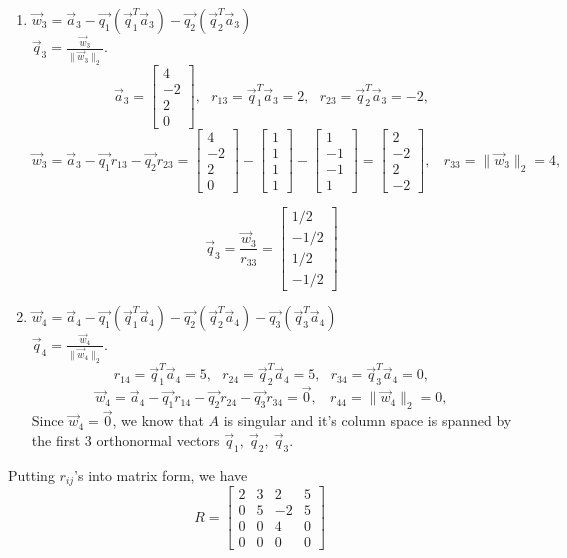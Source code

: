 \documentclass{article}
\newcommand{\norm}[1]{\|#1\|}
\newcommand{\normII}[1]{\norm{#1}_2}
\newcommand{\bmat}[1]{\begin{bmatrix}#1\end{bmatrix}}
\newcommand{\sij}{_{ij}}
\begin{document}
\begin{enumerate}
\item $\vec w_3 = \vec a_3 - \vec{q_1} (\vec q_1^T \vec a_3) - \vec{q_2} (\vec q_2^T \vec a_3)$\\
$\vec q_3 = \frac{\vec w_3}{\normII{\vec w_3}}.$
\[ \vec a_3 = \bmat{4 \\ -2 \\ 2 \\ 0},\ \ \ r_{13} = \vec q_1^T \vec a_3 = 2,\ \ \ r_{23} = \vec q_2^T \vec a_3 = -2, \] 
\[ \vec w_3 = \vec a_3 - \vec{q_1}r_{13} - \vec{q_2}r_{23} =  \bmat{4 \\ -2 \\ 2 \\ 0} - \bmat{1 \\ 1 \\ 1 \\ 1} - \bmat{1 \\ -1 \\ -1 \\ 1} = \bmat{2 \\ -2 \\ 2 \\ -2},\ \ \ \ r_{33} = \normII{\vec w_3} = 4, \]

\[ \vec q_3 = \frac{\vec w_3}{r_{33}} = \bmat{1/2 \\ -1/2 \\ 1/2 \\ -1/2} \]

\item $\vec w_4 = \vec a_4 - \vec{q_1} (\vec q_1^T \vec a_4) - \vec{q_2} (\vec q_2^T \vec a_4) - \vec{q_3} (\vec q_3^T \vec a_4)$\\
$\vec q_4 = \frac{\vec w_4}{\normII{\vec w_4}}.$
\[ r_{14} = \vec q_1^T \vec a_4 = 5,\ \ \ r_{24} = \vec q_2^T \vec a_4 = 5,\ \ \ r_{34} = \vec q_3^T \vec a_4 = 0, \] 
\[ \vec w_4 = \vec a_4 - \vec{q_1}r_{14} - \vec{q_2}r_{24} - \vec{q_3}r_{34} =  \vec 0,\ \ \ \ r_{44} = \normII{\vec w_4} = 0, \]
Since $\vec w_4=\vec 0$, we know that $A$ is singular and it's column space is spanned by the first 3 orthonormal vectors $\vec q_1,\ \vec q_2,\ \vec q_3$.
\end{enumerate}

Putting $r\sij$'s into matrix form, we have
\[ R = \bmat{2 & 3 & 2  & 5 \\
		 	 0 & 5 & -2 & 5 \\
		 	 0 & 0 & 4  & 0 \\
		 	 0 & 0 & 0  & 0} \]
\end{document}
